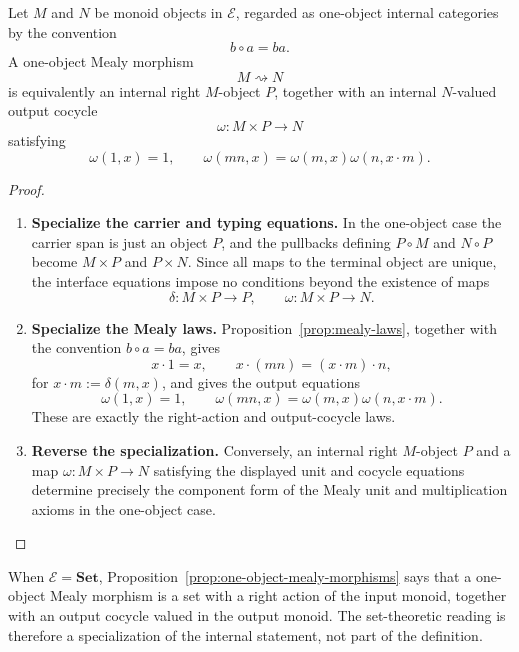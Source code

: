 \begin{proposition}
\label{prop:one-object-mealy-morphisms}
    Let \(M\) and \(N\) be monoid objects in \(\mathcal E\), regarded as one-object internal categories by the convention
    \[
        b\circ a=ba.
    \]
    A one-object Mealy morphism
    \[
        M\rightsquigarrow N
    \]
    is equivalently an internal right \(M\)-object \(P\), together with an internal \(N\)-valued output cocycle
    \[
        \omega:M\times P\to N
    \]
    satisfying
    \[
        \omega(1,x)=1,
        \qquad
        \omega(mn,x)=\omega(m,x)\omega(n,x\cdot m).
    \]
\end{proposition}
\begin{proof}
    \leavevmode
    \begin{enumerate}
        \item \textbf{Specialize the carrier and typing equations.} In the one-object case the carrier span is just an object \(P\), and the pullbacks defining \(P\circ M\) and \(N\circ P\) become \(M\times P\) and \(P\times N\). Since all maps to the terminal object are unique, the interface equations impose no conditions beyond the existence of maps
        \[
            \delta:M\times P\to P,
            \qquad
            \omega:M\times P\to N.
        \]

        \item \textbf{Specialize the Mealy laws.} Proposition~\ref{prop:mealy-laws}, together with the convention \(b\circ a=ba\), gives
        \[
            x\cdot 1=x,
            \qquad
            x\cdot(mn)=(x\cdot m)\cdot n,
        \]
        for \(x\cdot m:=\delta(m,x)\), and gives the output equations
        \[
            \omega(1,x)=1,
            \qquad
            \omega(mn,x)=\omega(m,x)\omega(n,x\cdot m).
        \]
        These are exactly the right-action and output-cocycle laws.

        \item \textbf{Reverse the specialization.} Conversely, an internal right \(M\)-object \(P\) and a map \(\omega:M\times P\to N\) satisfying the displayed unit and cocycle equations determine precisely the component form of the Mealy unit and multiplication axioms in the one-object case.
    \end{enumerate}
\end{proof}

\begin{remark}
\label{rem:set-one-object-systems}
    When \(\mathcal E=\mathbf{Set}\), Proposition~\ref{prop:one-object-mealy-morphisms} says that a one-object Mealy morphism is a set with a right action of the input monoid, together with an output cocycle valued in the output monoid. The set-theoretic reading is therefore a specialization of the internal statement, not part of the definition.
\end{remark}

